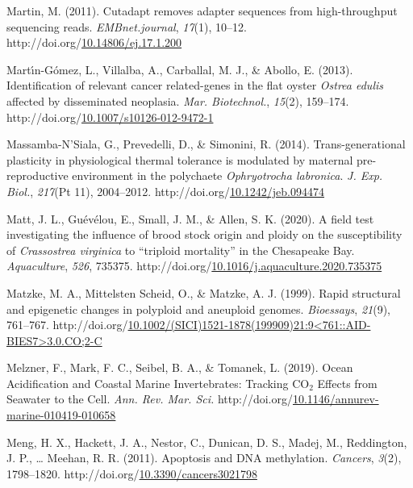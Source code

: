 \documentclass [11pt, proquest] {uwthesis}[2015/03/03]
\newlength{\cslhangindent}
\newenvironment{CSLReferences}%
{\setlength{\parindent}{0pt}%
\everypar{\setlength{\hangindent}{\cslhangindent}}\ignorespaces}%
{\par}
\begin{document}
\begin{CSLReferences}{1}{0}
\leavevmode\hypertarget{ref-Martin2011}{}%
Martin, M. (2011). {Cutadapt removes adapter sequences from high-throughput sequencing reads}. \emph{EMBnet.journal}, \emph{17}(1), 10--12. http://doi.org/\href{https://doi.org/10.14806/ej.17.1.200}{10.14806/ej.17.1.200}

\leavevmode\hypertarget{ref-Martin-Gomez2013}{}%
Martı́n-Gómez, L., Villalba, A., Carballal, M. J., \& Abollo, E. (2013). {Identification of relevant cancer related-genes in the flat oyster \emph{Ostrea edulis} affected by disseminated neoplasia}. \emph{Mar. Biotechnol.}, \emph{15}(2), 159--174. http://doi.org/\href{https://doi.org/10.1007/s10126-012-9472-1}{10.1007/s10126-012-9472-1}

\leavevmode\hypertarget{ref-Massamba-NSiala2014}{}%
Massamba-N'Siala, G., Prevedelli, D., \& Simonini, R. (2014). {Trans-generational plasticity in physiological thermal tolerance is modulated by maternal pre-reproductive environment in the polychaete \emph{Ophryotrocha labronica}}. \emph{J. Exp. Biol.}, \emph{217}(Pt 11), 2004--2012. http://doi.org/\href{https://doi.org/10.1242/jeb.094474}{10.1242/jeb.094474}

\leavevmode\hypertarget{ref-Matt2020}{}%
Matt, J. L., Guévélou, E., Small, J. M., \& Allen, S. K. (2020). {A field test investigating the influence of brood stock origin and ploidy on the susceptibility of \emph{Crassostrea virginica} to {``triploid mortality''} in the Chesapeake Bay}. \emph{Aquaculture}, \emph{526}, 735375. http://doi.org/\href{https://doi.org/10.1016/j.aquaculture.2020.735375}{10.1016/j.aquaculture.2020.735375}

\leavevmode\hypertarget{ref-Matzke1999}{}%
Matzke, M. A., Mittelsten Scheid, O., \& Matzke, A. J. (1999). {Rapid structural and epigenetic changes in polyploid and aneuploid genomes}. \emph{Bioessays}, \emph{21}(9), 761--767. http://doi.org/\href{https://doi.org/10.1002/(SICI)1521-1878(199909)21:9\%3C761::AID-BIES7\%3E3.0.CO;2-C}{10.1002/(SICI)1521-1878(199909)21:9\textless761::AID-BIES7\textgreater3.0.CO;2-C}

\leavevmode\hypertarget{ref-Melzner2019}{}%
Melzner, F., Mark, F. C., Seibel, B. A., \& Tomanek, L. (2019). {Ocean Acidification and Coastal Marine Invertebrates: Tracking {CO\(_2\)} Effects from Seawater to the Cell}. \emph{Ann. Rev. Mar. Sci.} http://doi.org/\href{https://doi.org/10.1146/annurev-marine-010419-010658}{10.1146/annurev-marine-010419-010658}

\leavevmode\hypertarget{ref-Meng2011}{}%
Meng, H. X., Hackett, J. A., Nestor, C., Dunican, D. S., Madej, M., Reddington, J. P., \ldots{} Meehan, R. R. (2011). {Apoptosis and DNA methylation}. \emph{Cancers}, \emph{3}(2), 1798--1820. http://doi.org/\href{https://doi.org/10.3390/cancers3021798}{10.3390/cancers3021798}


\end{CSLReferences}
\end{document}
